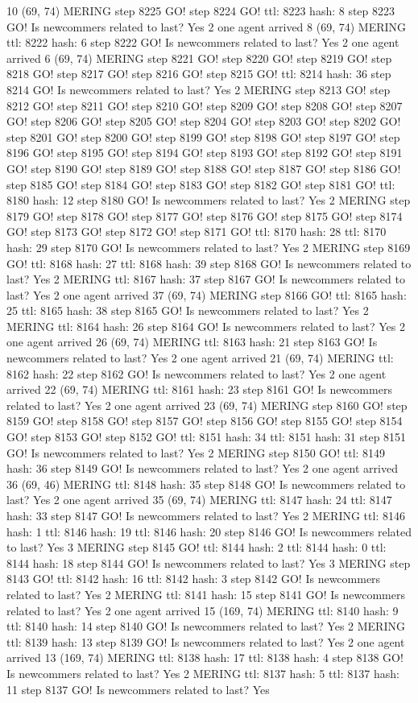 10 (69, 74) MERING step 8225 GO! step 8224 GO! ttl: 8223 hash: 8 step 8223 GO! Is newcommers related to last? Yes 2 one agent arrived 8 (69, 74) MERING ttl: 8222 hash: 6 step 8222 GO! Is newcommers related to last? Yes 2 one agent arrived 6 (69, 74) MERING step 8221 GO! step 8220 GO! step 8219 GO! step 8218 GO! step 8217 GO! step 8216 GO! step 8215 GO! ttl: 8214 hash: 36 step 8214 GO! Is newcommers related to last? Yes 2 MERING step 8213 GO! step 8212 GO! step 8211 GO! step 8210 GO! step 8209 GO! step 8208 GO! step 8207 GO! step 8206 GO! step 8205 GO! step 8204 GO! step 8203 GO! step 8202 GO! step 8201 GO! step 8200 GO! step 8199 GO! step 8198 GO! step 8197 GO! step 8196 GO! step 8195 GO! step 8194 GO! step 8193 GO! step 8192 GO! step 8191 GO! step 8190 GO! step 8189 GO! step 8188 GO! step 8187 GO! step 8186 GO! step 8185 GO! step 8184 GO! step 8183 GO! step 8182 GO! step 8181 GO! ttl: 8180 hash: 12 step 8180 GO! Is newcommers related to last? Yes 2 MERING step 8179 GO! step 8178 GO! step 8177 GO! step 8176 GO! step 8175 GO! step 8174 GO! step 8173 GO! step 8172 GO! step 8171 GO! ttl: 8170 hash: 28 ttl: 8170 hash: 29 step 8170 GO! Is newcommers related to last? Yes 2 MERING step 8169 GO! ttl: 8168 hash: 27 ttl: 8168 hash: 39 step 8168 GO! Is newcommers related to last? Yes 2 MERING ttl: 8167 hash: 37 step 8167 GO! Is newcommers related to last? Yes 2 one agent arrived 37 (69, 74) MERING step 8166 GO! ttl: 8165 hash: 25 ttl: 8165 hash: 38 step 8165 GO! Is newcommers related to last? Yes 2 MERING ttl: 8164 hash: 26 step 8164 GO! Is newcommers related to last? Yes 2 one agent arrived 26 (69, 74) MERING ttl: 8163 hash: 21 step 8163 GO! Is newcommers related to last? Yes 2 one agent arrived 21 (69, 74) MERING ttl: 8162 hash: 22 step 8162 GO! Is newcommers related to last? Yes 2 one agent arrived 22 (69, 74) MERING ttl: 8161 hash: 23 step 8161 GO! Is newcommers related to last? Yes 2 one agent arrived 23 (69, 74) MERING step 8160 GO! step 8159 GO! step 8158 GO! step 8157 GO! step 8156 GO! step 8155 GO! step 8154 GO! step 8153 GO! step 8152 GO! ttl: 8151 hash: 34 ttl: 8151 hash: 31 step 8151 GO! Is newcommers related to last? Yes 2 MERING step 8150 GO! ttl: 8149 hash: 36 step 8149 GO! Is newcommers related to last? Yes 2 one agent arrived 36 (69, 46) MERING ttl: 8148 hash: 35 step 8148 GO! Is newcommers related to last? Yes 2 one agent arrived 35 (69, 74) MERING ttl: 8147 hash: 24 ttl: 8147 hash: 33 step 8147 GO! Is newcommers related to last? Yes 2 MERING ttl: 8146 hash: 1 ttl: 8146 hash: 19 ttl: 8146 hash: 20 step 8146 GO! Is newcommers related to last? Yes 3 MERING step 8145 GO! ttl: 8144 hash: 2 ttl: 8144 hash: 0 ttl: 8144 hash: 18 step 8144 GO! Is newcommers related to last? Yes 3 MERING step 8143 GO! ttl: 8142 hash: 16 ttl: 8142 hash: 3 step 8142 GO! Is newcommers related to last? Yes 2 MERING ttl: 8141 hash: 15 step 8141 GO! Is newcommers related to last? Yes 2 one agent arrived 15 (169, 74) MERING ttl: 8140 hash: 9 ttl: 8140 hash: 14 step 8140 GO! Is newcommers related to last? Yes 2 MERING ttl: 8139 hash: 13 step 8139 GO! Is newcommers related to last? Yes 2 one agent arrived 13 (169, 74) MERING ttl: 8138 hash: 17 ttl: 8138 hash: 4 step 8138 GO! Is newcommers related to last? Yes 2 MERING ttl: 8137 hash: 5 ttl: 8137 hash: 11 step 8137 GO! Is newcommers related to last? Yes 